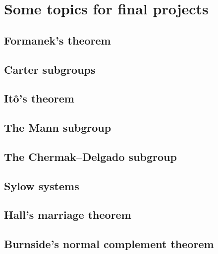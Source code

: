 \section*{Some topics for final projects}

\fancyhf{}
\fancyfoot[R]{\thepage}
\fancyhead[L]{\course}
\setlength{\headheight}{14pt}

\subsection*{Formanek's theorem}

\subsection*{Carter subgroups}

\subsection*{It\^o's theorem}

\subsection*{The Mann subgroup}

\subsection*{The Chermak--Delgado subgroup}

\subsection*{Sylow systems}

\subsection*{Hall's marriage theorem}

\subsection*{Burnside's normal complement theorem}





